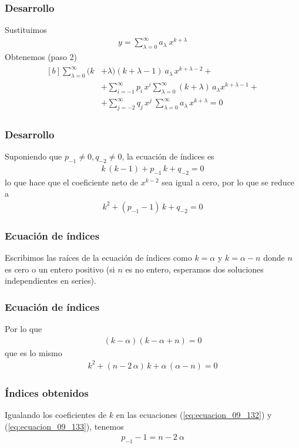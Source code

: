 \begin{frame}
\frametitle{Desarrollo}
Sustituimos
{\fontsize{12}{12}\selectfont
\begin{align*}
y = \sum_{\lambda = 0}^{\infty} a_{\lambda} \: x^{k + \lambda}
\end{align*}}
\pause
Obtenemos (paso 2)
\fontsize{12}{12}\selectfont
\begin{align}
\begin{aligned}[b]
\sum_{\lambda=0}^{\infty} (k &+ \lambda)(k + \lambda - 1) \: a_{\lambda} \, x^{k + \lambda - 2} + \\
&+ \sum_{i=-1}^{\infty} p_{i} \, x^{i} \sum_{\lambda=0}^{\infty} (k + \lambda) \,  a_{\lambda} x^{k + \lambda - 1} + \\
&+ \sum_{j=-2}^{\infty} q_{j} \, x^{j} \: \sum_{\lambda=0}^{\infty} a_{\lambda} \, x^{k + \lambda} = 0
\end{aligned}
\label{eq:ecuacion_09_131}
\end{align}
\end{frame}
\begin{frame}
\frametitle{Desarrollo}
Suponiendo que $p_{-1} \neq 0, q_{-2} \neq 0$, la ecuación de índices es
\begin{align*}
k \, (k - 1) + p_{-1} \, k + q_{-2} = 0
\end{align*}
lo que hace que el coeficiente neto de $x^{k-2}$ sea igual a cero, por lo que se reduce a
\pause
\begin{align}
k^{2} + (p_{-1} - 1) \, k + q_{-2} = 0
\label{eq:ecuacion_09_132}
\end{align}
\end{frame}
\begin{frame}
\frametitle{Ecuación de índices}
Escribimos las raíces de la ecuación de índices como $k = \alpha$ y $k= \alpha - n$ donde $n$ es cero o un entero positivo (si $n$ es no entero, esperamos dos soluciones independientes en series).
\end{frame}
\begin{frame}
\frametitle{Ecuación de índices}
Por lo que
\begin{align}
(k - \alpha)(k - \alpha + n) = 0
\label{eq:ecuacion_09_133}
\end{align}
\pause
que es lo mismo
\begin{align*}
k^{2} + (n - 2 \, \alpha) \, k + \alpha \, (\alpha - n) = 0
\end{align*}
\end{frame}
\begin{frame}
\frametitle{Índices obtenidos}
Igualando los coeficientes de $k$ en las ecuaciones (\ref{eq:ecuacion_09_132}) y (\ref{eq:ecuacion_09_133}), tenemos
\begin{align}
p_{-1} -1 = n - 2 \: \alpha
\label{eq:ecuacion_09_134}
\end{align}
\end{frame}
